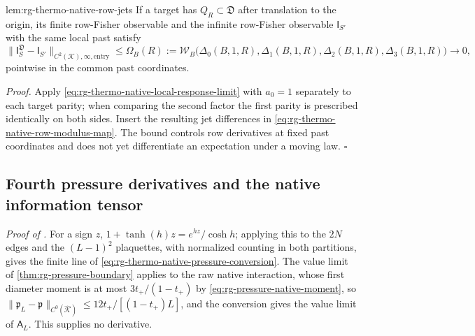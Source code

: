 {lem:rg-thermo-native-row-jets}
If a target has $Q_R\subset\mathfrak D$ after translation to the origin, its
finite row-Fisher observable and the infinite row-Fisher observable
$\mathsf I_{S'}$ with the same local past satisfy
\begin{equation}
 \|\mathsf I^{\mathfrak D}_S-\mathsf I_{S'}\|_{C^2(\mathcal K),\infty,\mathrm{entry}}
 \le\Omega_B(R):=\mathcal W_B\bigl(
 \Delta_0(B,1,R),\Delta_1(B,1,R),\Delta_2(B,1,R),\Delta_3(B,1,R)\bigr)
 \longrightarrow0,
 \label{eq:rg-thermo-native-free-row-comparison}
\end{equation}
pointwise in the common past coordinates. 

\noindent\emph{Proof.}
Apply \cref{eq:rg-thermo-native-local-response-limit} with $a_0=1$ separately
to each target parity; when comparing the second factor the first parity is
prescribed identically on both sides. Insert the resulting jet differences in
\cref{eq:rg-thermo-native-row-modulus-map}. The bound controls row
derivatives at fixed past coordinates and does not yet differentiate an
expectation under a moving law. $\square$

\subsection{Fourth pressure derivatives and the native information tensor}
\label{sec:rg-thermo-native-pressure}

\noindent\emph{Proof of .}
For a sign $z$, $1+\tanh(h)z=e^{hz}/\cosh h$; applying this to the $2N$ edges
and the $(L-1)^2$ plaquettes, with normalized counting in both partitions,
gives the finite line of \cref{eq:rg-thermo-native-pressure-conversion}.
The value limit of \cref{thm:rg-pressure-boundary} applies to the raw native
interaction, whose first diameter moment is at most $3t_+/(1-t_+)$ by
\cref{eq:rg-pressure-native-moment}, so
$\|\mathfrak p_L-\mathfrak p\|_{C^0(\widehat{\mathcal K})}\le12t_+/[(1-t_+)L]$,
and the conversion gives the value limit of $\mathsf A_L$. This supplies no
derivative.

